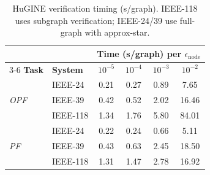 \begin{table}[t]
\centering
\caption{HuGINE verification timing (s/graph). IEEE-118 uses subgraph verification; IEEE-24/39 use full-graph with approx-star.}
\label{tab:hugine_timing}
\setlength{\tabcolsep}{14pt}
\begin{tabular}{l l c c c c}
\toprule
& & \multicolumn{4}{c}{Time (s/graph) per $\epsilon_{\mathrm{node}}$} \\
\cmidrule(lr){3-6}
\textbf{Task} & \textbf{System} & $10^{-5}$ & $10^{-4}$ & $10^{-3}$ & $10^{-2}$ \\
\midrule
\multirow{3}{*}{\textit{OPF}} & IEEE-24 & \phantom{0}0.21 & \phantom{0}0.27 & \phantom{0}0.89 & \phantom{0}7.65 \\
 & IEEE-39 & \phantom{0}0.42 & \phantom{0}0.52 & \phantom{0}2.02 & \phantom{0}16.46 \\
 & IEEE-118 & \phantom{0}1.34 & \phantom{0}1.76 & \phantom{0}5.80 & \phantom{0}84.01 \\
\midrule
\multirow{3}{*}{\textit{PF}} & IEEE-24 & \phantom{0}0.22 & \phantom{0}0.24 & \phantom{0}0.66 & \phantom{0}5.11 \\
 & IEEE-39 & \phantom{0}0.43 & \phantom{0}0.63 & \phantom{0}2.45 & \phantom{0}18.50 \\
 & IEEE-118 & \phantom{0}1.31 & \phantom{0}1.47 & \phantom{0}2.78 & \phantom{0}16.92 \\
\bottomrule
\end{tabular}
\end{table}
